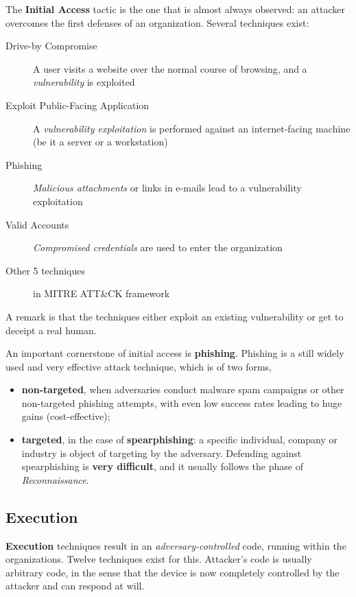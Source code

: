 \documentclass[10pt]{\classname}
\begin{document}
The \textbf{Initial Access} tactic is the one that is almost always observed:
an attacker overcomes the first defenses of an organization. Several techniques
exist:
\begin{description}
    \item[Drive\--by Compromise] A user visits a website over the normal course
        of browsing, and a \emph{vulnerability} is exploited
    \item[Exploit Public\--Facing Application] A \emph{vulnerability
        exploitation} is performed against an internet\--facing machine (be it
        a server or a workstation)
    \item[Phishing] \emph{Malicious attachments} or links in e\--mails lead to a
        vulnerability exploitation
    \item[Valid Accounts] \emph{Compromised credentials} are used to enter the organization
    \item[Other 5 techniques] in MITRE ATT\&CK framework
\end{description}

A remark is that the techniques either exploit an existing vulnerability or get
to deceipt a real human.

An important cornerstone of initial access is \textbf{phishing}. Phishing is a still widely used and very effective attack technique, which is of two forms,
\begin{itemize}
    \item \textbf{non\--targeted}, when adversaries conduct malware spam
        campaigns or other non\--targeted phishing attempts, with even low
        success rates leading to huge gains (cost\--effective);
    \item \textbf{targeted}, in the case of \textbf{spearphishing}: a specific
        individual, company or industry is object of targeting by the
        adversary. Defending against spearphishing is \textbf{very difficult},
        and it usually follows the phase of \emph{Reconnaissance}.
\end{itemize}


\subsection{Execution}

\textbf{Execution} techniques result in an \emph{adversary\--controlled} code,
running within the organizations. Twelve techniques exist for this. Attacker's
code is usually arbitrary code, in the sense that the device is now completely
controlled by the attacker and can respond at will.
\end{document}
